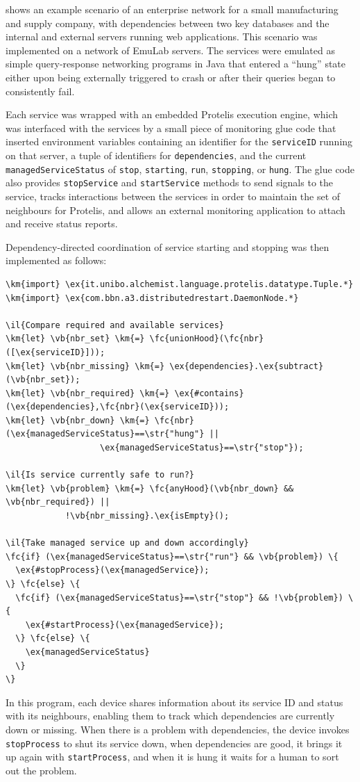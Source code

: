 \documentclass[12pt,a4paper,twoside,openright]{book}
\begin{document}
 shows an example scenario of an enterprise network for a small manufacturing and supply company, with dependencies between two key databases and the internal and external servers running web applications.
%
This scenario was implemented on a network of EmuLab \cite{EmuLab} servers.
%
The services were emulated as simple query-response networking programs in Java that entered a ``hung'' state either upon being externally triggered to crash or after their queries began to consistently fail. 

Each service was wrapped with an embedded Protelis execution engine, which was interfaced with the services by a small piece of monitoring glue code that inserted environment variables containing an identifier for the {\tt serviceID} running on that server, a tuple of identifiers for {\tt dependencies}, and the current {\tt managedServiceStatus} of {\tt stop}, {\tt starting}, {\tt run}, {\tt stopping}, or {\tt hung}.
%
The glue code also provides {\tt stopService} and {\tt startService} methods to send signals to the service, tracks interactions between the services in order to maintain the set of neighbours for Protelis, and allows an external monitoring application to attach and receive status reports.

Dependency-directed coordination of service starting and stopping was then implemented as follows:
%
\begin{Verbatim}[samepage=true, frame=single, commandchars=\\\{\}]
\km{import} \ex{it.unibo.alchemist.language.protelis.datatype.Tuple.*}
\km{import} \ex{com.bbn.a3.distributedrestart.DaemonNode.*}

\il{Compare required and available services}
\km{let} \vb{nbr_set} \km{=} \fc{unionHood}(\fc{nbr}([\ex{serviceID}]));
\km{let} \vb{nbr_missing} \km{=} \ex{dependencies}.\ex{subtract}(\vb{nbr_set});
\km{let} \vb{nbr_required} \km{=} \ex{#contains}(\ex{dependencies},\fc{nbr}(\ex{serviceID})); 
\km{let} \vb{nbr_down} \km{=} \fc{nbr}(\ex{managedServiceStatus}==\str{"hung"} ||
                   \ex{managedServiceStatus}==\str{"stop"});

\il{Is service currently safe to run?}
\km{let} \vb{problem} \km{=} \fc{anyHood}(\vb{nbr_down} && \vb{nbr_required}) ||
            !\vb{nbr_missing}.\ex{isEmpty}();

\il{Take managed service up and down accordingly}
\fc{if} (\ex{managedServiceStatus}==\str{"run"} && \vb{problem}) \{
  \ex{#stopProcess}(\ex{managedService});
\} \fc{else} \{
  \fc{if} (\ex{managedServiceStatus}==\str{"stop"} && !\vb{problem}) \{
    \ex{#startProcess}(\ex{managedService});
  \} \fc{else} \{
    \ex{managedServiceStatus}
  \}
\}
\end{Verbatim}
In this program, each device shares information about its service ID and status with its neighbours, enabling them to track which dependencies are currently down or missing.
%
When there is a problem with dependencies, the device invokes {\tt stopProcess} to shut its service down, when dependencies are good, it brings it up again with {\tt startProcess}, and when it is hung it waits for a human to sort out the problem.
\end{document}
